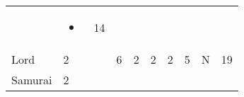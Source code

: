 \documentclass[12pt]{article}
\begin{document}
\begin{longtable}[]{@{}llllllllll@{}}
\begin{minipage}[t]{0.06\columnwidth}\raggedright\strut
\strut\end{minipage} &
\begin{minipage}[t]{0.07\columnwidth}\raggedright\strut
\begin{itemize}
\item
\end{itemize}
\strut\end{minipage} &
\begin{minipage}[t]{0.08\columnwidth}\raggedright\strut
14
\strut\end{minipage}\tabularnewline
\begin{minipage}[t]{0.13\columnwidth}\raggedright\strut
Lord
\strut\end{minipage} &
\begin{minipage}[t]{0.06\columnwidth}\raggedright\strut
2
\strut\end{minipage} &
\begin{minipage}[t]{0.06\columnwidth}\raggedright\strut
\strut\end{minipage} &
\begin{minipage}[t]{0.06\columnwidth}\raggedright\strut
6
\strut\end{minipage} &
\begin{minipage}[t]{0.06\columnwidth}\raggedright\strut
2
\strut\end{minipage} &
\begin{minipage}[t]{0.06\columnwidth}\raggedright\strut
2
\strut\end{minipage} &
\begin{minipage}[t]{0.06\columnwidth}\raggedright\strut
2
\strut\end{minipage} &
\begin{minipage}[t]{0.06\columnwidth}\raggedright\strut
5
\strut\end{minipage} &
\begin{minipage}[t]{0.07\columnwidth}\raggedright\strut
N
\strut\end{minipage} &
\begin{minipage}[t]{0.08\columnwidth}\raggedright\strut
19
\strut\end{minipage}\tabularnewline
\begin{minipage}[t]{0.13\columnwidth}\raggedright\strut
Samurai
\strut\end{minipage} &
\begin{minipage}[t]{0.06\columnwidth}\raggedright\strut
2
\strut\end{minipage} &

\end{longtable}
\end{document}
